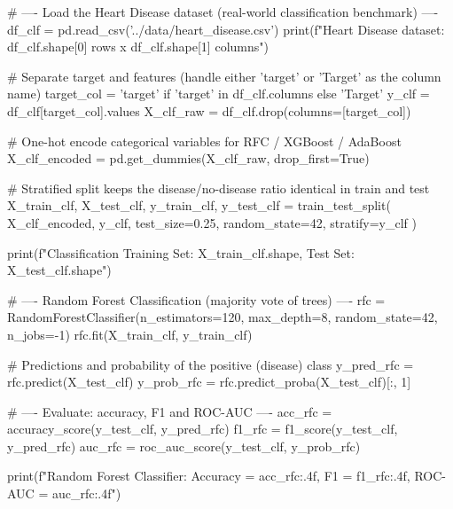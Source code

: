 \begin{codebox}[title={Load the Heart Disease dataset (real-world classification benchmark)}]
# ---- Load the Heart Disease dataset (real-world classification benchmark) ----
df_clf = pd.read_csv('../data/heart_disease.csv')
print(f"Heart Disease dataset: {df_clf.shape[0]} rows x {df_clf.shape[1]} columns")

# Separate target and features (handle either 'target' or 'Target' as the column name)
target_col = 'target' if 'target' in df_clf.columns else 'Target'
y_clf = df_clf[target_col].values
X_clf_raw = df_clf.drop(columns=[target_col])

# One-hot encode categorical variables for RFC / XGBoost / AdaBoost
X_clf_encoded = pd.get_dummies(X_clf_raw, drop_first=True)

# Stratified split keeps the disease/no-disease ratio identical in train and test
X_train_clf, X_test_clf, y_train_clf, y_test_clf = train_test_split(
    X_clf_encoded, y_clf, test_size=0.25, random_state=42, stratify=y_clf
)

print(f"Classification Training Set: {X_train_clf.shape}, Test Set: {X_test_clf.shape}")

# ---- Random Forest Classification (majority vote of trees) ----
rfc = RandomForestClassifier(n_estimators=120, max_depth=8, random_state=42, n_jobs=-1)
rfc.fit(X_train_clf, y_train_clf)

# Predictions and probability of the positive (disease) class
y_pred_rfc = rfc.predict(X_test_clf)
y_prob_rfc = rfc.predict_proba(X_test_clf)[:, 1]

# ---- Evaluate: accuracy, F1 and ROC-AUC ----
acc_rfc = accuracy_score(y_test_clf, y_pred_rfc)
f1_rfc = f1_score(y_test_clf, y_pred_rfc)
auc_rfc = roc_auc_score(y_test_clf, y_prob_rfc)

print(f"Random Forest Classifier: Accuracy = {acc_rfc:.4f}, F1 = {f1_rfc:.4f}, ROC-AUC = {auc_rfc:.4f}")
\end{codebox}
